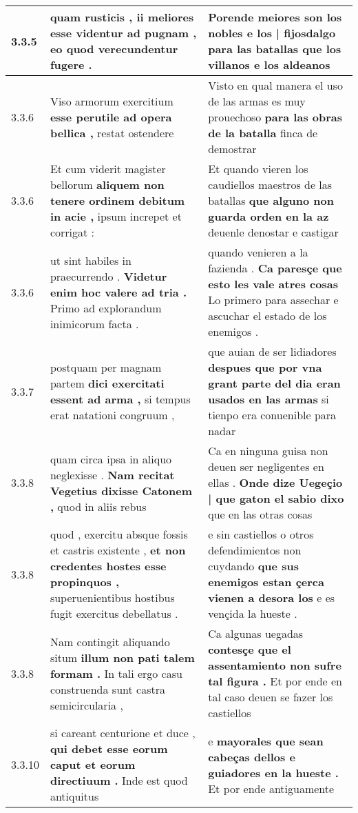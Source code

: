 \begin{tabular}{|p{1cm}|p{6.5cm}|p{6.5cm}|}
3.3.5 & quam rusticis , \textbf{ ii meliores esse videntur ad pugnam , } eo quod verecundentur fugere . & Porende meiores son los nobles \textbf{ e los | fijosdalgo para las batallas } que los villanos e los aldeanos \\\hline
3.3.6 & Viso armorum exercitium \textbf{ esse perutile ad opera bellica , } restat ostendere & Visto en qual manera el uso de las armas es muy prouechoso \textbf{ para las obras de la batalla } finca de demostrar \\\hline
3.3.6 & Et cum viderit magister bellorum \textbf{ aliquem non tenere ordinem debitum in acie , } ipsum increpet et corrigat : & Et quando vieren los caudiellos maestros de las batallas \textbf{ que alguno non guarda orden en la az } deuenle denostar e castigar \\\hline
3.3.6 & ut sint habiles in praecurrendo . \textbf{ Videtur enim hoc valere ad tria . } Primo ad explorandum inimicorum facta . & quando venieren a la fazienda . \textbf{ Ca paresçe que esto les vale atres cosas } Lo primero para assechar e ascuchar el estado de los enemigos . \\\hline
3.3.7 & postquam per magnam partem \textbf{ dici exercitati essent ad arma , } si tempus erat natationi congruum , & que auian de ser lidiadores \textbf{ despues que por vna grant parte del dia eran usados en las armas } si tienpo era conuenible para nadar \\\hline
3.3.8 & quam circa ipsa in aliquo neglexisse . \textbf{ Nam recitat Vegetius dixisse Catonem , } quod in aliis rebus & Ca en ninguna guisa non deuen ser negligentes en ellas . \textbf{ Onde dize Uegeçio | que gaton el sabio dixo } que en las otras cosas \\\hline
3.3.8 & quod , exercitu absque fossis et castris existente , \textbf{ et non credentes hostes esse propinquos , } superuenientibus hostibus fugit exercitus debellatus . & e sin castiellos o otros defendimientos non cuydando \textbf{ que sus enemigos estan çerca vienen a desora los } e es vençida la hueste . \\\hline
3.3.8 & Nam contingit aliquando situm \textbf{ illum non pati talem formam . } In tali ergo casu construenda sunt castra semicircularia , & Ca algunas uegadas \textbf{ contesçe que el assentamiento non sufre tal figura . } Et por ende en tal caso deuen se fazer los castiellos \\\hline
3.3.10 & si careant centurione et duce , \textbf{ qui debet esse eorum caput et eorum directiuum . } Inde est quod antiquitus & e \textbf{ mayorales que sean cabeças dellos e guiadores en la hueste . } Et por ende antiguamente \\\hline

\end{tabular}
